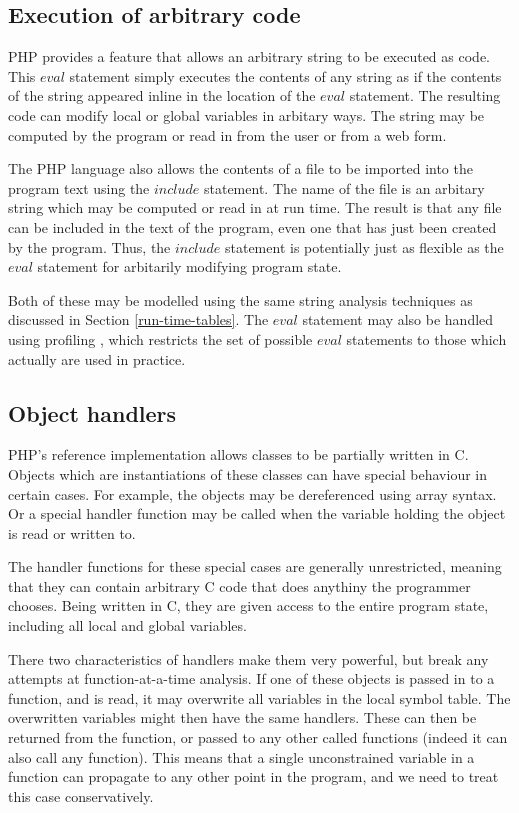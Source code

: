 \subsection{Execution of arbitrary code}
PHP provides a feature that allows an arbitrary string to be executed
as code. This $eval$ statement simply executes the contents of any
string as if the contents of the string appeared inline in the
location of the $eval$ statement. The resulting code can modify local
or global variables in arbitary ways. The string may be computed by
the program or read in from the user or from a web form.

The PHP language also allows the contents of a file to be imported
into the program text using the $include$ statement. The name of the
file is an arbitary string which may be computed or read in at run
time. The result is that any file can be included in the text of the
program, even one that has just been created by the program.  Thus,
the $include$ statement is potentially just as flexible as the $eval$
statement for arbitarily modifying program state.

Both of these may be modelled using the same string analysis
techniques \cite{Wassermann2007} as discussed in Section
\ref{run-time-tables}.  The $eval$ statement may also be handled using
profiling \cite{Furr2009}, which restricts the set of possible $eval$
statements to those which actually are used in practice.

\subsection{Object handlers}
PHP's reference implementation allows classes to be partially written
in C.  Objects which are instantiations of these classes can have
special behaviour in certain cases.  For example, the objects may be
dereferenced using array syntax. Or a special handler function may be
called when the variable holding the object is read or written to.

The handler functions for these special cases are generally
unrestricted, meaning that they can contain arbitrary C code that does
anythiny the programmer chooses.  Being written in C, they are given
access to the entire program state, including all local and global
variables.

There two characteristics of handlers make them very powerful, but
break any attempts at function-at-a-time analysis.  If one of these
objects is passed in to a function, and is read, it may overwrite all
variables in the local symbol table.  The overwritten variables might
then have the same handlers.  These can then be returned from the
function, or passed to any other called functions (indeed it can also
call any function).  This means that a single unconstrained variable
in a function can propagate to any other point in the program, and we
need to treat this case conservatively.


